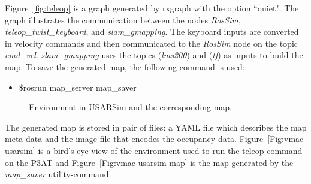 Figure~\ref{fig:teleop} is a graph generated by rxgraph with the option ``quiet". The graph illustrates the communication between the nodes {\it RosSim}, {\it teleop\_twist\_keyboard}, and {\it slam\_gmapping}. The keyboard inputs are converted in velocity commands and then communicated to the {\it RosSim} node on the topic {\it cmd\_vel}. {\it slam\_gmapping} uses the topics ({\it lms200}) and ({\it tf}) as inputs to build the map. To save the generated map, the following command is used:

\begin{itemize}
\item[]\$rosrun map\_server map\_saver
\end{itemize}

\begin{figure}[t!]
\centering
{}\qquad
{}
\caption{Environment in USARSim and the corresponding map.}
\end{figure}
The generated map is stored in pair of files: a YAML file which describes the map meta-data and the image file that encodes the occupancy data. Figure~\ref{Fig:vmac-usarsim} is a bird's eye view of the environment used to run the teleop command on the P3AT and Figure~\ref{Fig:vmac-usarsim-map} is the map generated by the {\it map\_saver} utility-command.







